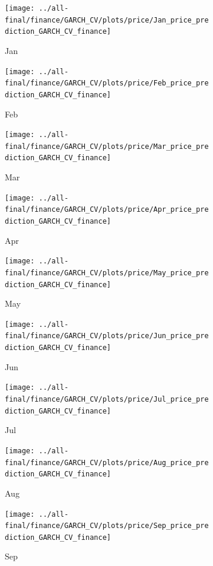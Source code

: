 \documentclass[ngerman]{ttlab-qualify}
\begin{document}
\newpage
\begin{figure}[H]
\centering
  \begin{subfigure}{.3\linewidth}
  \texttt{[image: ../all-final/finance/GARCH\_CV/plots/price/Jan\_price\_prediction\_GARCH\_CV\_finance]}\hfill
  \caption{Jan}
  \end{subfigure}
  \begin{subfigure}{.3\linewidth}
  \texttt{[image: ../all-final/finance/GARCH\_CV/plots/price/Feb\_price\_prediction\_GARCH\_CV\_finance]}\hfill
  \caption{Feb}
  \end{subfigure}
  \begin{subfigure}{.3\linewidth}
  \texttt{[image: ../all-final/finance/GARCH\_CV/plots/price/Mar\_price\_prediction\_GARCH\_CV\_finance]}\hfill
  \caption{Mar}
  \end{subfigure}\par\medskip
  \begin{subfigure}{.3\linewidth}
  \texttt{[image: ../all-final/finance/GARCH\_CV/plots/price/Apr\_price\_prediction\_GARCH\_CV\_finance]}\hfill
  \caption{Apr}
  \end{subfigure}
  \begin{subfigure}{.3\linewidth}
  \texttt{[image: ../all-final/finance/GARCH\_CV/plots/price/May\_price\_prediction\_GARCH\_CV\_finance]}\hfill
  \caption{May}
  \end{subfigure}
  \begin{subfigure}{.3\linewidth}
  \texttt{[image: ../all-final/finance/GARCH\_CV/plots/price/Jun\_price\_prediction\_GARCH\_CV\_finance]}\hfill
  \caption{Jun}
  \end{subfigure}\par\medskip
  \begin{subfigure}{.3\linewidth}
  \texttt{[image: ../all-final/finance/GARCH\_CV/plots/price/Jul\_price\_prediction\_GARCH\_CV\_finance]}\hfill
  \caption{Jul}
  \end{subfigure}
  \begin{subfigure}{.3\linewidth}
  \texttt{[image: ../all-final/finance/GARCH\_CV/plots/price/Aug\_price\_prediction\_GARCH\_CV\_finance]}\hfill
  \caption{Aug}
  \end{subfigure}
  \begin{subfigure}{.3\linewidth}
  \texttt{[image: ../all-final/finance/GARCH\_CV/plots/price/Sep\_price\_prediction\_GARCH\_CV\_finance]}\hfill
  \caption{Sep}
  \end{subfigure}\par\medskip
  \begin{subfigure}{.3\linewidth}

\end{subfigure}
\end{figure}
\end{document}
